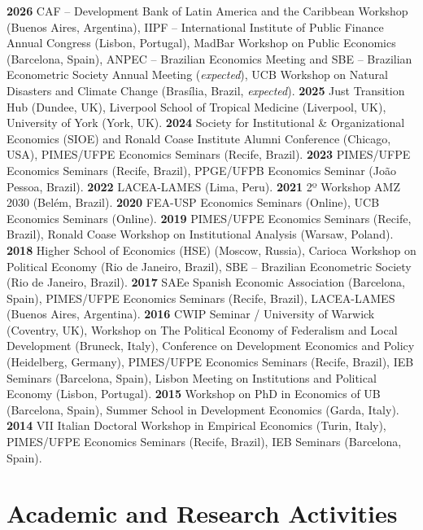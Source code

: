 \documentclass[a4paper,9pt]{article}
\begin{document}
\noindent \textbf{2026} CAF -- Development Bank of Latin America and the Caribbean Workshop (Buenos Aires, Argentina), IIPF -- International Institute of Public Finance Annual Congress (Lisbon, Portugal), MadBar Workshop on Public Economics (Barcelona, Spain), ANPEC -- Brazilian Economics Meeting and SBE -- Brazilian Econometric Society Annual Meeting (\emph{expected}), UCB Workshop on Natural Disasters and Climate Change (Brasília, Brazil, \emph{expected}). \textbf{2025} Just Transition Hub (Dundee, UK), Liverpool School of Tropical Medicine (Liverpool, UK), University of York (York, UK). \textbf{2024} Society for Institutional \& Organizational Economics (SIOE) and Ronald Coase Institute Alumni Conference (Chicago, USA), PIMES/UFPE Economics Seminars (Recife, Brazil). \textbf{2023} PIMES/UFPE Economics Seminars (Recife, Brazil), PPGE/UFPB Economics Seminar (João Pessoa, Brazil). \textbf{2022} LACEA-LAMES (Lima, Peru). \textbf{2021} 2º Workshop AMZ 2030 (Belém, Brazil). \textbf{2020} FEA-USP Economics Seminars (Online), UCB Economics Seminars (Online). \textbf{2019} PIMES/UFPE Economics Seminars (Recife, Brazil), Ronald Coase Workshop on Institutional Analysis (Warsaw, Poland). \textbf{2018} Higher School of Economics (HSE) (Moscow, Russia), Carioca Workshop on Political Economy (Rio de Janeiro, Brazil), SBE -- Brazilian Econometric Society (Rio de Janeiro, Brazil). \textbf{2017} SAEe Spanish Economic Association (Barcelona, Spain), PIMES/UFPE Economics Seminars (Recife, Brazil), LACEA-LAMES (Buenos Aires, Argentina). \textbf{2016} CWIP Seminar / University of Warwick (Coventry, UK), Workshop on The Political Economy of Federalism and Local Development (Bruneck, Italy), Conference on Development Economics and Policy (Heidelberg, Germany), PIMES/UFPE Economics Seminars (Recife, Brazil), IEB Seminars (Barcelona, Spain), Lisbon Meeting on Institutions and Political Economy (Lisbon, Portugal). \textbf{2015} Workshop on PhD in Economics of UB (Barcelona, Spain), Summer School in Development Economics (Garda, Italy). \textbf{2014} VII Italian Doctoral Workshop in Empirical Economics (Turin, Italy), PIMES/UFPE Economics Seminars (Recife, Brazil), IEB Seminars (Barcelona, Spain).

\section{Academic and Research Activities}
\end{document}
